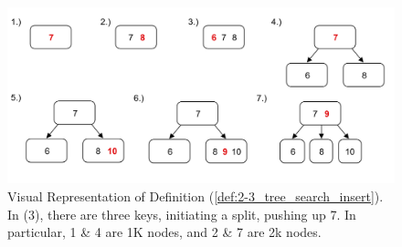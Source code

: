 \vspace{-1em}
\begin{figure}[ht!]
    \begin{center}
    \includegraphics[width=\textwidth]{./Sections/graphs/search/2_3_insert.png}
    \end{center}
     \caption{Visual Representation of Definition (\ref{def:2-3_tree_search_insert}). In (3),
     there are three keys, initiating a split, pushing up 7. In particular, 1 \& 4 are 1K nodes, and 2 \& 7 are 2k nodes.}\label{fig:2-3_tree_insert}
  \end{figure}

\newpage